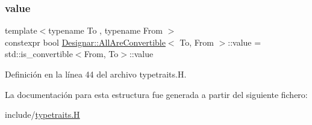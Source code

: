 \subsubsection{\texorpdfstring{value}{value}}
{\footnotesize\ttfamily template$<$typename To , typename From $>$ \\
constexpr bool \hyperlink{struct_designar_1_1_all_are_convertible}{Designar\+::\+All\+Are\+Convertible}$<$ To, From $>$\+::value = std\+::is\+\_\+convertible$<$From, To$>$\+::value\hspace{0.3cm}{\ttfamily [static]}}



Definición en la línea 44 del archivo typetraits.\+H.



La documentación para esta estructura fue generada a partir del siguiente fichero\+:\begin{DoxyCompactItemize}
\item 
include/\hyperlink{typetraits_8_h}{typetraits.\+H}\end{DoxyCompactItemize}
